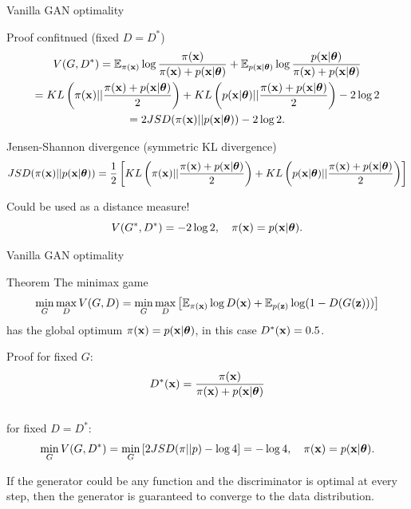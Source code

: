 \begin{frame}{Vanilla GAN optimality}
	\begin{block}{Proof confitnued (fixed $D = D^*$)}
		\vspace{-0.5cm}
		\begin{multline*}
			V(G, D^*) = \mathbb{E}_{\pi(\mathbf{x})} \log \frac{\pi(\mathbf{x})}{\pi(\mathbf{x}) + p(\mathbf{x} | \boldsymbol{\theta})} + \mathbb{E}_{p(\mathbf{x} | \boldsymbol{\theta})} \log \frac{p(\mathbf{x} | \boldsymbol{\theta})}{\pi(\mathbf{x}) + p(\mathbf{x} | \boldsymbol{\theta})} \\
		 = KL \left(\pi(\mathbf{x}) || \frac{\pi(\mathbf{x}) + p(\mathbf{x} | \boldsymbol{\theta})}{2}\right) + KL \left(p(\mathbf{x} | \boldsymbol{\theta}) || \frac{\pi(\mathbf{x}) + p(\mathbf{x} | \boldsymbol{\theta})}{2}\right) - 2\log 2 \\
		 = 2JSD(\pi(\mathbf{x}) || p(\mathbf{x} | \boldsymbol{\theta})) - 2\log 2.
		\end{multline*}
	\end{block}
	\vspace{-0.3cm}
	\begin{block}{Jensen-Shannon divergence (symmetric KL divergence)}
		\vspace{-0.2cm}
		\footnotesize
		\[
			JSD(\pi(\mathbf{x}) || p(\mathbf{x} | \boldsymbol{\theta})) = \frac{1}{2} \left[KL \left(\pi(\mathbf{x}) || \frac{\pi(\mathbf{x}) + p(\mathbf{x} | \boldsymbol{\theta})}{2}\right) + KL \left(p(\mathbf{x} | \boldsymbol{\theta}) || \frac{\pi(\mathbf{x}) + p(\mathbf{x} | \boldsymbol{\theta})}{2}\right) \right]
		\]
	\end{block}
	Could be used as a distance measure!
	\[
		V(G^*, D^*) = -2\log 2, \quad \pi(\mathbf{x}) = p(\mathbf{x} | \boldsymbol{\theta}).
	\]
	
\end{frame}
\begin{frame}{Vanilla GAN optimality}
	\begin{block}{Theorem}
		The minimax game 
		\vspace{-0.1cm}
		\[
			\min_{G} \max_D  V(G, D) = \min_{G} \max_D \left[ \mathbb{E}_{\pi(\mathbf{x})} \log D(\mathbf{x}) + \mathbb{E}_{p(\mathbf{z})} \log (1 - D(G(\mathbf{z}))) \right]
		\]
		has the global optimum $\pi(\mathbf{x}) = p(\mathbf{x} | \boldsymbol{\theta})$, in this case $D^*(\mathbf{x}) = 0.5$.
	\end{block}
	\vspace{-0.2cm}
	\begin{block}{Proof}
	for fixed $G$:
	\[
		D^*(\mathbf{x}) = \frac{\pi(\mathbf{x})}{\pi(\mathbf{x}) + p(\mathbf{x} | \boldsymbol{\theta})}
	\]
	\vspace{-0.5cm} \\
	for fixed $D = D^*$:
	\[
		\min_{G} V(G, D^*) = \min_{G} \left[ 2 JSD(\pi || p) - \log 4 \right] = -\log 4, \quad \pi(\mathbf{x}) = p(\mathbf{x} | \boldsymbol{\theta}).
	\]
	\vspace{-0.6cm}
	\end{block}
	If the generator could be any function and the discriminator is optimal at every step, then the generator is guaranteed to converge to the data distribution.
\end{frame}
